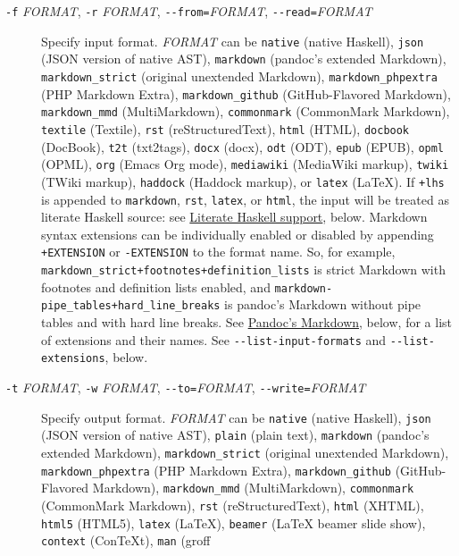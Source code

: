 \documentclass[]{article}
\begin{document}
\begin{description}
\item[\texttt{-f} \emph{FORMAT}, \texttt{-r} \emph{FORMAT},
\texttt{-\/-from=}\emph{FORMAT}, \texttt{-\/-read=}\emph{FORMAT}]
Specify input format. \emph{FORMAT} can be \texttt{native} (native
Haskell), \texttt{json} (JSON version of native AST), \texttt{markdown}
(pandoc's extended Markdown), \texttt{markdown\_strict} (original
unextended Markdown), \texttt{markdown\_phpextra} (PHP Markdown Extra),
\texttt{markdown\_github} (GitHub-Flavored Markdown),
\texttt{markdown\_mmd} (MultiMarkdown), \texttt{commonmark} (CommonMark
Markdown), \texttt{textile} (Textile), \texttt{rst} (reStructuredText),
\texttt{html} (HTML), \texttt{docbook} (DocBook), \texttt{t2t}
(txt2tags), \texttt{docx} (docx), \texttt{odt} (ODT), \texttt{epub}
(EPUB), \texttt{opml} (OPML), \texttt{org} (Emacs Org mode),
\texttt{mediawiki} (MediaWiki markup), \texttt{twiki} (TWiki markup),
\texttt{haddock} (Haddock markup), or \texttt{latex} (LaTeX). If
\texttt{+lhs} is appended to \texttt{markdown}, \texttt{rst},
\texttt{latex}, or \texttt{html}, the input will be treated as literate
Haskell source: see
\protect\hyperlink{literate-haskell-support}{Literate Haskell support},
below. Markdown syntax extensions can be individually enabled or
disabled by appending \texttt{+EXTENSION} or \texttt{-EXTENSION} to the
format name. So, for example,
\texttt{markdown\_strict+footnotes+definition\_lists} is strict Markdown
with footnotes and definition lists enabled, and
\texttt{markdown-pipe\_tables+hard\_line\_breaks} is pandoc's Markdown
without pipe tables and with hard line breaks. See
\protect\hyperlink{pandocs-markdown}{Pandoc's Markdown}, below, for a
list of extensions and their names. See \texttt{-\/-list-input-formats}
and \texttt{-\/-list-extensions}, below.
\item[\texttt{-t} \emph{FORMAT}, \texttt{-w} \emph{FORMAT},
\texttt{-\/-to=}\emph{FORMAT}, \texttt{-\/-write=}\emph{FORMAT}]
Specify output format. \emph{FORMAT} can be \texttt{native} (native
Haskell), \texttt{json} (JSON version of native AST), \texttt{plain}
(plain text), \texttt{markdown} (pandoc's extended Markdown),
\texttt{markdown\_strict} (original unextended Markdown),
\texttt{markdown\_phpextra} (PHP Markdown Extra),
\texttt{markdown\_github} (GitHub-Flavored Markdown),
\texttt{markdown\_mmd} (MultiMarkdown), \texttt{commonmark} (CommonMark
Markdown), \texttt{rst} (reStructuredText), \texttt{html} (XHTML),
\texttt{html5} (HTML5), \texttt{latex} (LaTeX), \texttt{beamer} (LaTeX
beamer slide show), \texttt{context} (ConTeXt), \texttt{man} (groff

\end{description}
\end{document}
